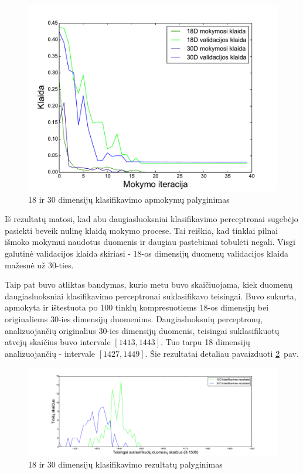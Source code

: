 \documentclass{VUMIFPSbakalaurinis}
\begin{document}
\begin{figure}
	\includegraphics[scale=0.75]{pics/dim_comparisons_2015-5-27_14-21-13}
	\caption{18 ir 30 dimensijų klasifikavimo apmokymų palyginimas}
	\label{fig:dim-comparisons}
\end{figure}

Iš rezultatų matosi, kad abu daugiasluoksniai klasifikavimo perceptronai sugebėjo pasiekti beveik nulinę klaidą mokymo procese.
Tai reiškia, kad tinklai pilnai išmoko mokymui naudotus duomenis ir daugiau pastebimai tobulėti negali.
Visgi galutinė validacijos klaida skiriasi - 18-os dimensijų duomenų validacijos klaida mažesnė už 30-ties.

Taip pat buvo atliktas bandymas, kurio metu buvo skaičiuojama, kiek duomenų daugiasluoksniai klasifikavimo perceptronai suklasifikavo teisingai.
Buvo sukurta, apmokyta ir ištestuota po 100 tinklų kompresuotiems 18-os dimensijų bei originaliems 30-ies dimensijų duomenims.
Daugiasluoksnių perceptronų, analizuojančių originalius 30-ies dimensijų duomenis, teisingai suklasifikuotų atvejų skaičius buvo intervale $[1413, 1443]$.
Tuo tarpu 18 dimensijų analizuojančių - intervale $[1427, 1449]$.
Šie rezultatai detaliau pavaizduoti \ref{fig:correct-count}~pav.

\begin{figure}
	\includegraphics[scale=0.35]{pics/correct}
	\caption{18 ir 30 dimensijų klasifikavimo rezultatų palyginimas}
	\label{fig:correct-count}
\end{figure}
\end{document}
